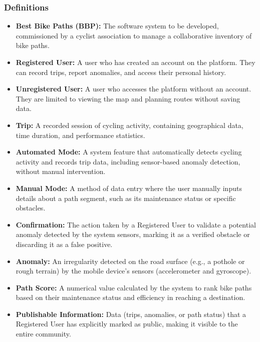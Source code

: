 \subsubsection{Definitions}
\begin{itemize}
    \item \textbf{Best Bike Paths (BBP):} The software system to be developed, commissioned by a cyclist association to manage a collaborative inventory of bike paths.
    \item \textbf{Registered User:} A user who has created an account on the platform. They can record trips, report anomalies, and access their personal history.
    \item \textbf{Unregistered User:} A user who accesses the platform without an account. They are limited to viewing the map and planning routes without saving data.
    \item \textbf{Trip:} A recorded session of cycling activity, containing geographical data, time duration, and performance statistics.
    \item \textbf{Automated Mode:} A system feature that automatically detects cycling activity and records trip data, including sensor-based anomaly detection, without manual intervention.
    \item \textbf{Manual Mode:} A method of data entry where the user manually inputs details about a path segment, such as its maintenance status or specific obstacles.
    \item \textbf{Confirmation:} The action taken by a Registered User to validate a potential anomaly detected by the system sensors, marking it as a verified obstacle or discarding it as a false positive.
    \item \textbf{Anomaly:} An irregularity detected on the road surface (e.g., a pothole or rough terrain) by the mobile device's sensors (accelerometer and gyroscope).
    \item \textbf{Path Score:} A numerical value calculated by the system to rank bike paths based on their maintenance status and efficiency in reaching a destination.
    \item \textbf{Publishable Information:} Data (trips, anomalies, or path status) that a Registered User has explicitly marked as public, making it visible to the entire community.
\end{itemize}

